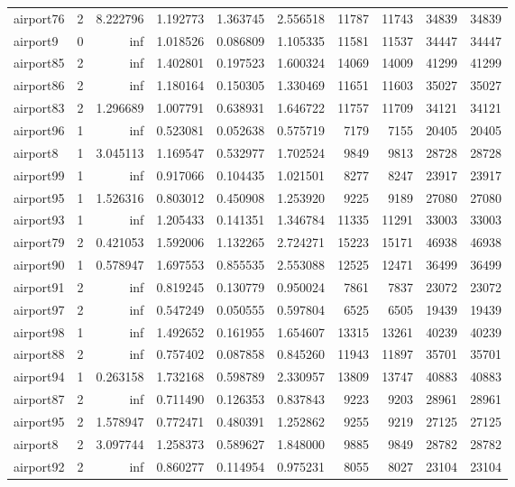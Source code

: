 \begin{longtable}{|l|r|r|r|r|r|r|r|r|r|}
airport76 & 2 & 8.222796 & 1.192773 & 1.363745 & 2.556518 & 11787 & 11743 & 34839 & 34839 \\
airport9 & 0 & inf & 1.018526 & 0.086809 & 1.105335 & 11581 & 11537 & 34447 & 34447 \\
airport85 & 2 & inf & 1.402801 & 0.197523 & 1.600324 & 14069 & 14009 & 41299 & 41299 \\
airport86 & 2 & inf & 1.180164 & 0.150305 & 1.330469 & 11651 & 11603 & 35027 & 35027 \\
airport83 & 2 & 1.296689 & 1.007791 & 0.638931 & 1.646722 & 11757 & 11709 & 34121 & 34121 \\
airport96 & 1 & inf & 0.523081 & 0.052638 & 0.575719 & 7179 & 7155 & 20405 & 20405 \\
airport8 & 1 & 3.045113 & 1.169547 & 0.532977 & 1.702524 & 9849 & 9813 & 28728 & 28728 \\
airport99 & 1 & inf & 0.917066 & 0.104435 & 1.021501 & 8277 & 8247 & 23917 & 23917 \\
airport95 & 1 & 1.526316 & 0.803012 & 0.450908 & 1.253920 & 9225 & 9189 & 27080 & 27080 \\
airport93 & 1 & inf & 1.205433 & 0.141351 & 1.346784 & 11335 & 11291 & 33003 & 33003 \\
airport79 & 2 & 0.421053 & 1.592006 & 1.132265 & 2.724271 & 15223 & 15171 & 46938 & 46938 \\
airport90 & 1 & 0.578947 & 1.697553 & 0.855535 & 2.553088 & 12525 & 12471 & 36499 & 36499 \\
airport91 & 2 & inf & 0.819245 & 0.130779 & 0.950024 & 7861 & 7837 & 23072 & 23072 \\
airport97 & 2 & inf & 0.547249 & 0.050555 & 0.597804 & 6525 & 6505 & 19439 & 19439 \\
airport98 & 1 & inf & 1.492652 & 0.161955 & 1.654607 & 13315 & 13261 & 40239 & 40239 \\
airport88 & 2 & inf & 0.757402 & 0.087858 & 0.845260 & 11943 & 11897 & 35701 & 35701 \\
airport94 & 1 & 0.263158 & 1.732168 & 0.598789 & 2.330957 & 13809 & 13747 & 40883 & 40883 \\
airport87 & 2 & inf & 0.711490 & 0.126353 & 0.837843 & 9223 & 9203 & 28961 & 28961 \\
airport95 & 2 & 1.578947 & 0.772471 & 0.480391 & 1.252862 & 9255 & 9219 & 27125 & 27125 \\
airport8 & 2 & 3.097744 & 1.258373 & 0.589627 & 1.848000 & 9885 & 9849 & 28782 & 28782 \\
airport92 & 2 & inf & 0.860277 & 0.114954 & 0.975231 & 8055 & 8027 & 23104 & 23104 \\

\end{longtable}
